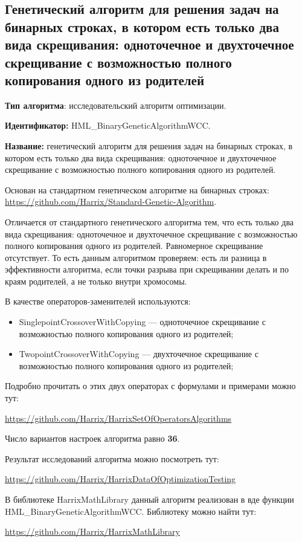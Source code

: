 \subsection{Генетический алгоритм для решения задач на бинарных строках, в котором есть только два вида скрещивания: одноточечное и двухточечное скрещивание с возможностью полного копирования одного из родителей}\label{HarrixOptimizationAlgorithms:HML_BinaryGeneticAlgorithmWCC}

\textbf{Тип алгоритма}: исследовательский алгоритм оптимизации.

\textbf{Идентификатор:} HML\_BinaryGeneticAlgorithmWCC.

\textbf{Название:} генетический алгоритм для решения задач на бинарных строках, в котором есть только два вида скрещивания: одноточечное и двухточечное скрещивание с возможностью полного копирования одного из родителей.

Основан на стандартном генетическом алгоритме на бинарных строках:  \href{https://github.com/Harrix/Standard-Genetic-Algorithm}{https://github.com/Harrix/Standard-Genetic-Algorithm}. 

Отличается от стандартного генетического алгоритма тем, что есть только два вида скрещивания: одноточечное и двухточечное скрещивание с возможностью полного копирования одного из родителей. Равномерное скрещивание отсутствует. То есть данным алгоритмом проверяем: есть ли разница в эффективности алгоритма, если точки разрыва при скрещивании делать и по краям родителей, а не только внутри хромосомы.

В качестве операторов-заменителей используются:
\begin{itemize}
\item SinglepointCrossoverWithCopying --- одноточечное скрещивание с возможностью полного копирования одного из родителей;
\item TwopointCrossoverWithCopying --- двухточечное скрещивание с возможностью полного копирования одного из родителей;
\end{itemize}

Подробно прочитать о этих двух операторах с формулами и примерами можно тут:

\href{https://github.com/Harrix/HarrixSetOfOperatorsAlgorithms}{https://github.com/Harrix/HarrixSetOfOperatorsAlgorithms}

Число вариантов настроек алгоритма равно \textbf{36}.

Результат исследований алгоритма можно посмотреть тут:

\href{https://github.com/Harrix/HarrixDataOfOptimizationTesting}{https://github.com/Harrix/HarrixDataOfOptimizationTesting}

В библиотеке HarrixMathLibrary данный алгоритм реализован в вде функции HML\_BinaryGeneticAlgorithmWCC. Библиотеку можно найти тут:

\href{https://github.com/Harrix/HarrixMathLibrary}{https://github.com/Harrix/HarrixMathLibrary}